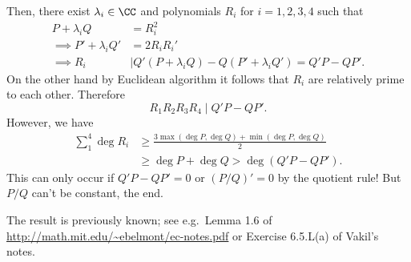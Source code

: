Then, there exist $\lambda_i \in \CC$ and polynomials $R_i$
for $i=1,2,3,4$ such that
\begin{align*}
  P + \lambda_i Q &= R_i^2 \\
  \implies P' + \lambda_i Q' &= 2 R_i R_i' \\
  \implies R_i &\mid Q'(P+\lambda_i Q) - Q(P' + \lambda_i Q')
  = Q'P - QP'.
\end{align*}
On the other hand by Euclidean algorithm it follows that
$R_i$ are relatively prime to each other.
Therefore
\[ R_1 R_2 R_3 R_4 \mid Q' P - Q P'. \]
However, we have
\begin{align*}
  \sum_1^4 \deg R_i
  &\ge \frac{3\max(\deg P, \deg Q) + \min(\deg P, \deg Q)}{2} \\
  &\ge \deg P + \deg Q > \deg(Q'P - QP').
\end{align*}
This can only occur if $Q'P - QP' = 0$ or $(P/Q)' = 0$
by the quotient rule!
But $P/Q$ can't be constant, the end.

\begin{remark*}
  The result is previously known; see e.g.\
  Lemma 1.6 of \url{http://math.mit.edu/~ebelmont/ec-notes.pdf}
  or Exercise 6.5.L(a) of Vakil's notes.
\end{remark*}
